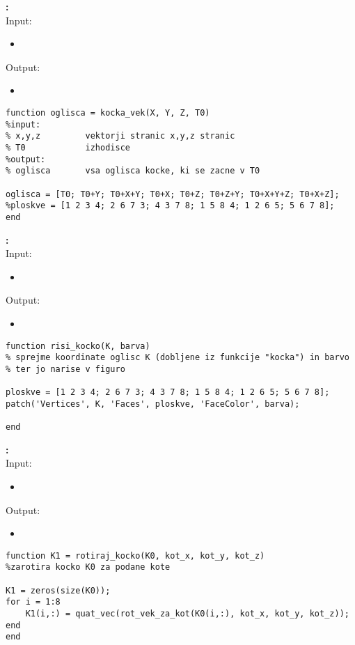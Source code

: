 \documentclass[12pt,a4paper,twoside]{article}
\theoremstyle{definition} %
\theoremstyle{plain} %
\numberwithin{equation}{section}  %
\begin{document}
\vspace{1cm}
\textbf{:}\\
Input:
\begin{itemize}
\item 
\end{itemize}
Output:
\begin{itemize}
\item 
\end{itemize}

\begin{lstlisting}[caption = {\color{green} kocka\_vek}]
function oglisca = kocka_vek(X, Y, Z, T0)
%input:
% x,y,z         vektorji stranic x,y,z stranic
% T0            izhodisce
%output:
% oglisca       vsa oglisca kocke, ki se zacne v T0

oglisca = [T0; T0+Y; T0+X+Y; T0+X; T0+Z; T0+Z+Y; T0+X+Y+Z; T0+X+Z];
%ploskve = [1 2 3 4; 2 6 7 3; 4 3 7 8; 1 5 8 4; 1 2 6 5; 5 6 7 8]; 
end
\end{lstlisting}

\vspace{1cm}
\textbf{:}\\
Input:
\begin{itemize}
\item 
\end{itemize}
Output:
\begin{itemize}
\item 
\end{itemize}

\begin{lstlisting}[caption = {\color{green} risi\_kocko}]
function risi_kocko(K, barva)
% sprejme koordinate oglisc K (dobljene iz funkcije "kocka") in barvo
% ter jo narise v figuro

ploskve = [1 2 3 4; 2 6 7 3; 4 3 7 8; 1 5 8 4; 1 2 6 5; 5 6 7 8]; 
patch('Vertices', K, 'Faces', ploskve, 'FaceColor', barva);

end
\end{lstlisting}

\vspace{1cm}
\textbf{:}\\
Input:
\begin{itemize}
\item 
\end{itemize}
Output:
\begin{itemize}
\item 
\end{itemize}

\begin{lstlisting}[caption = {\color{green} rotiraj\_kocko}]
function K1 = rotiraj_kocko(K0, kot_x, kot_y, kot_z)
%zarotira kocko K0 za podane kote

K1 = zeros(size(K0));
for i = 1:8
    K1(i,:) = quat_vec(rot_vek_za_kot(K0(i,:), kot_x, kot_y, kot_z));
end
end
\end{lstlisting}
\end{document}
